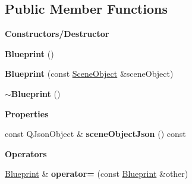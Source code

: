 \subsection*{Public Member Functions}
\begin{Indent}\textbf{ Constructors/\+Destructor}\par
\begin{DoxyCompactItemize}
\item 
\mbox{\label{classrev_1_1_blueprint_a498ff5db2ffa509ac2b0210386d5dfd1}} 
{\bfseries Blueprint} ()
\item 
\mbox{\label{classrev_1_1_blueprint_aa4a382e3ac06cedfc5b2db1bef87563a}} 
{\bfseries Blueprint} (const \mbox{\hyperlink{classrev_1_1_scene_object}{Scene\+Object}} \&scene\+Object)
\item 
\mbox{\label{classrev_1_1_blueprint_a39e4fb9bf186e87f4ece12fdc1855adb}} 
{\bfseries $\sim$\+Blueprint} ()
\end{DoxyCompactItemize}
\end{Indent}
\begin{Indent}\textbf{ Properties}\par
\begin{DoxyCompactItemize}
\item 
\mbox{\label{classrev_1_1_blueprint_ac11f321e4ca9e4dac1d91569e4fac207}} 
const Q\+Json\+Object \& {\bfseries scene\+Object\+Json} () const
\end{DoxyCompactItemize}
\end{Indent}
\begin{Indent}\textbf{ Operators}\par
\begin{DoxyCompactItemize}
\item 
\mbox{\label{classrev_1_1_blueprint_a51ed2381a9a13c7fed1aa5fb0592a739}} 
\mbox{\hyperlink{classrev_1_1_blueprint}{Blueprint}} \& {\bfseries operator=} (const \mbox{\hyperlink{classrev_1_1_blueprint}{Blueprint}} \&other)
\end{DoxyCompactItemize}
\end{Indent}
